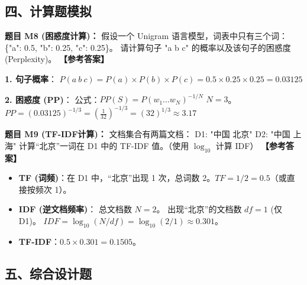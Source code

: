 \documentclass[a4paper,11pt]{article}
\newenvironment{question}[1]
    {\vspace{0.5cm}\noindent\textbf{题目 #1：}}
    {\vspace{0.2cm}}
\newenvironment{answer}
    {\noindent\textbf{【参考答案】}\par\small\color{blue}}
    {\par\vspace{0.5cm}\normalcolor}
\begin{document}
\subsection{四、计算题模拟}

\begin{question}{M8 (困惑度计算)}
假设一个 Unigram 语言模型，词表中只有三个词：\{"a": 0.5, "b": 0.25, "c": 0.25\}。
请计算句子 "a b c" 的概率以及该句子的困惑度 (Perplexity)。
\end{question}
\begin{answer}
\textbf{1. 句子概率}：
$P(a \ b \ c) = P(a) \times P(b) \times P(c) = 0.5 \times 0.25 \times 0.25 = 0.03125$

\textbf{2. 困惑度 (PP)}：
公式：$PP(S) = P(w_1 \dots w_N)^{-1/N}$
$N=3$。
$PP = (0.03125)^{-1/3} = (\frac{1}{32})^{-1/3} = (32)^{1/3} \approx 3.17$
\end{answer}

\begin{question}{M9 (TF-IDF计算)}
文档集合有两篇文档：
D1: "中国 北京"
D2: "中国 上海"
计算“北京”一词在 D1 中的 TF-IDF 值。（使用 $\log_{10}$ 计算 IDF）
\end{question}
\begin{answer}
\begin{itemize}
    \item \textbf{TF (词频)}：在 D1 中，“北京”出现 1 次，总词数 2。$TF = 1/2 = 0.5$（或直接按频次 1）。
    \item \textbf{IDF (逆文档频率)}：
    总文档数 $N=2$。
    出现“北京”的文档数 $df=1$ (仅 D1)。
    $IDF = \log_{10}(N/df) = \log_{10}(2/1) \approx 0.301$。
    \item \textbf{TF-IDF}：$0.5 \times 0.301 = 0.1505$。
\end{itemize}
\end{answer}

\subsection{五、综合设计题}
\end{document}
